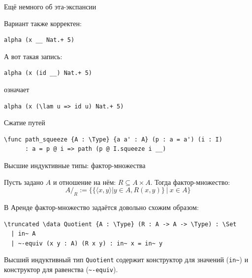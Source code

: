 \documentclass[aspectratio=169,dvipsnames,usenames]{beamer}
\begin{document}
\begin{frame}[fragile]{Ещё немного об эта-экспансии}

Вариант также корректен:
\begin{verbatim}
alpha (x __ Nat.+ 5)
\end{verbatim}

А вот такая запись:
\begin{verbatim}
alpha (x (id __) Nat.+ 5)
\end{verbatim}

означает

\begin{verbatim}
alpha (x (\lam u => id u) Nat.+ 5)
\end{verbatim}

\begin{exm}Сжатие путей

\begin{verbatim}
\func path_squeeze {A : \Type} {a a' : A} (p : a = a') (i : I) 
      : a = p @ i => path (p @ I.squeeze i __)
\end{verbatim}
\end{exm}
\end{frame}

\begin{frame}[fragile]{Высшие индуктивные типы: фактор-множества}
\begin{dfn}Пусть задано $A$ и отношение на нём: $R \subseteq A \times A$. Тогда фактор-множество:
$$A/_R := \big\{ \{\langle x,y\rangle |y \in A, R(x,y)\}\ |\ x \in A\big\}$$\end{dfn}

В Аренде фактор-множество задаётся довольно схожим образом:

\begin{verbatim}
\truncated \data Quotient {A : \Type} (R : A -> A -> \Type) : \Set
  | in~ A
  | ~-equiv (x y : A) (R x y) : in~ x = in~ y
\end{verbatim}

Высший индуктивный тип \verb!Quotient! содержит конструктор для значений (\verb!in~!)
и конструктор для равенства (\verb!~-equiv!).
\end{frame}
\end{document}
